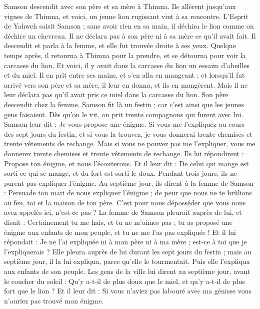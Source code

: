 \begin{multicols}{2}
Samson descendit avec son père et sa mère à Thimna. Ils allèrent jusqu'aux vignes de Thimna, et voici, un jeune lion rugissant vint à sa rencontre.
L'Esprit de Yahweh saisit Samson ; sans avoir rien en sa main, il déchira le lion comme on déchire un chevreau. Il ne déclara pas à son père ni à sa mère ce qu'il avait fait.
Il descendit et parla à la femme, et elle fut trouvée droite à ses yeux.
Quelque temps après, il retourna à Thimna pour la prendre, et se détourna pour voir la carcasse du lion. Et voici, il y avait dans la carcasse du lion un essaim d'abeilles et du miel.
Il en prit entre ses mains, et s'en alla en mangeant ; et lorsqu'il fut arrivé vers son père et sa mère, il leur en donna, et ils en mangèrent. Mais il ne leur déclara pas qu'il avait pris ce miel dans la carcasse du lion.
Son père descendit chez la femme. Samson fit là un festin ; car c'est ainsi que les jeunes gens faisaient.
Dès qu'on le vit, on prit trente compagnons qui furent avec lui.
Samson leur dit : Je vous propose une énigme. Si vous me l'expliquez au cours des sept jours du festin, et si vous la trouvez, je vous donnerai trente chemises et trente vêtements de rechange.
Mais si vous ne pouvez pas me l'expliquer, vous me donnerez trente chemises et trente vêtements de rechange. Ils lui répondirent : Propose ton énigme, et nous l'écouterons.
Et il leur dit : De celui qui mange est sorti ce qui se mange, et du fort est sorti le doux. Pendant trois jours, ils ne purent pas expliquer l'énigme.
Au septième jour, ils dirent à la femme de Samson : Persuade ton mari de nous expliquer l'énigme ; de peur que nous ne te brûlions au feu, toi et la maison de ton père. C'est pour nous déposséder que vous nous avez appelés ici, n'est-ce pas ?
La femme de Samson pleurait auprès de lui, et disait : Certainement tu me hais, et tu ne m'aimes pas ; tu as proposé une énigme aux enfants de mon peuple, et tu ne me l'as pas expliquée ! Et il lui répondait : Je ne l'ai expliquée ni à mon père ni à ma mère ; est-ce à toi que je l'expliquerais ?
Elle pleura auprès de lui durant les sept jours du festin ; mais au septième jour, il la lui expliqua, parce qu'elle le tourmentait. Puis elle l'expliqua aux enfants de son peuple.
Les gens de la ville lui dirent au septième jour, avant le coucher du soleil : Qu'y a-t-il de plus doux que le miel, et qu'y a-t-il de plus fort que le lion ? Et il leur dit : Si vous n'aviez pas labouré avec ma génisse vous n'auriez pas trouvé mon énigme.

\end{multicols}
